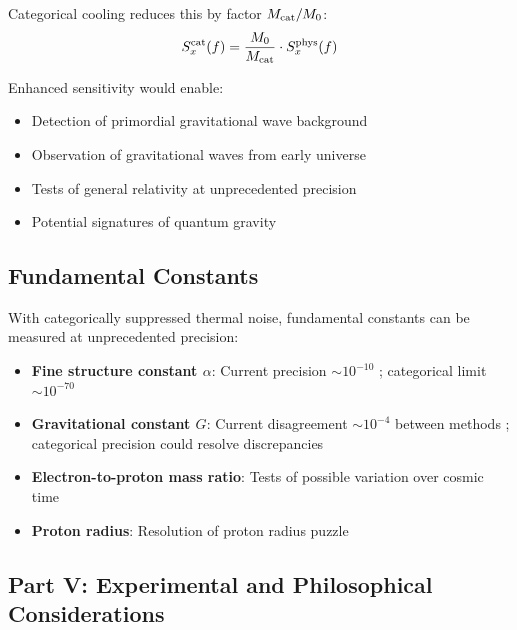 Categorical cooling reduces this by factor $M_{\mathrm{cat}}/M_0$:
\begin{equation}
S_x^{\text{cat}}(f) = \frac{M_0}{M_{\mathrm{cat}}} \cdot S_x^{\text{phys}}(f)
\end{equation}

Enhanced sensitivity would enable:
\begin{itemize}
    \item Detection of primordial gravitational wave background
    \item Observation of gravitational waves from early universe
    \item Tests of general relativity at unprecedented precision
    \item Potential signatures of quantum gravity
\end{itemize}

\subsection{Fundamental Constants}

With categorically suppressed thermal noise, fundamental constants can be measured at unprecedented precision:

\begin{itemize}
    \item \textbf{Fine structure constant $\alpha$}: Current precision $\sim 10^{-10}$ \cite{parker2018}; categorical limit $\sim 10^{-70}$

    \item \textbf{Gravitational constant $G$}: Current disagreement $\sim 10^{-4}$ between methods \cite{quinn2013}; categorical precision could resolve discrepancies

    \item \textbf{Electron-to-proton mass ratio}: Tests of possible variation over cosmic time \cite{uzan2011}

    \item \textbf{Proton radius}: Resolution of proton radius puzzle \cite{pohl2010}
\end{itemize}


\subsection*{Part V: Experimental and Philosophical Considerations}

